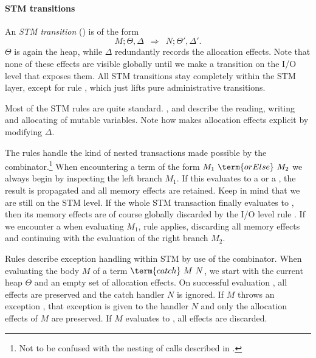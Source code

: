 \clearpage

\paragraph{STM transitions}

An \emph{STM transition} () is of the form 
$$M;\Theta,\Delta \enspace\Rightarrow\enspace N;\Theta',\Delta'.$$
$\Theta$ is again the heap, while $\Delta$ redundantly records the allocation effects.
Note that none of these effects are visible globally until we make a transition on the I/O level that exposes them.
All STM transitions stay completely within the STM layer, except for rule , which just lifts pure administrative transitions.

Most of the STM rules are quite standard.
,  and  describe the reading, writing and allocating of mutable variables.
Note how  makes allocation effects explicit by modifying $\Delta$.

The rules  handle the kind of nested transactions made possible by the  combinator.\footnote{Not to be confused with the nesting of  calls described in .}
When encountering a term of the form $M_1\ \term{orElse}\ M_2$ we always begin by inspecting the left branch $M_1$.
If this evaluates to a   or a  , the result is propagated and all memory effects are retained.
Keep in mind that we are still on the STM level.
If the whole STM transaction finally evaluates to , then its memory effects are of course globally discarded by the I/O level rule .
If we encounter a  when evaluating $M_1$, rule  applies, discarding all memory effects and continuing with the evaluation of the right branch $M_2$.

Rules  describe exception handling within STM by use of the  combinator.
When evaluating the body $M$ of a term $\term{catch}\ M\ N$, we start with the current heap $\Theta$ and an empty set of allocation effects.
On successful evaluation , all effects are preserved and the catch handler $N$ is ignored.
If $M$ throws an exception , that exception is given to the handler $N$ and only the allocation effects of $M$ are preserved.
If $M$ evaluates to  , all effects are discarded.

